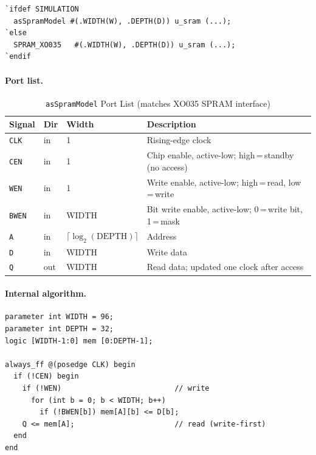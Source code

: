 \begin{verbatim}
`ifdef SIMULATION
  asSpramModel #(.WIDTH(W), .DEPTH(D)) u_sram (...);
`else
  SPRAM_XO035   #(.WIDTH(W), .DEPTH(D)) u_sram (...);
`endif
\end{verbatim}

\paragraph{Port list.}

\begin{table}[H]
\caption{\texttt{asSpramModel} Port List (matches XO035 SPRAM interface)}
\label{tab:asSpramModelPorts}
\centering
\begin{tabularx}{\textwidth}{|l |l |l |X|}
  \hline
  Signal & Dir & Width & Description \\
  \hline
  \hline
  \texttt{CLK}  & in  & 1     & Rising-edge clock \\
  \hline
  \texttt{CEN}  & in  & 1     & Chip enable, active-low; high\,=\,standby (no access) \\
  \hline
  \texttt{WEN}  & in  & 1     & Write enable, active-low; high\,=\,read, low\,=\,write \\
  \hline
  \texttt{BWEN} & in  & WIDTH & Bit write enable, active-low; 0\,=\,write bit, 1\,=\,mask \\
  \hline
  \texttt{A}    & in  & $\lceil\log_2(\text{DEPTH})\rceil$ & Address \\
  \hline
  \texttt{D}    & in  & WIDTH & Write data \\
  \hline
  \texttt{Q}    & out & WIDTH & Read data; updated one clock after access \\
  \hline
\end{tabularx}
\end{table}

\paragraph{Internal algorithm.}
\begin{verbatim}
parameter int WIDTH = 96;
parameter int DEPTH = 32;
logic [WIDTH-1:0] mem [0:DEPTH-1];

always_ff @(posedge CLK) begin
  if (!CEN) begin
    if (!WEN)                          // write
      for (int b = 0; b < WIDTH; b++)
        if (!BWEN[b]) mem[A][b] <= D[b];
    Q <= mem[A];                       // read (write-first)
  end
end
\end{verbatim}

